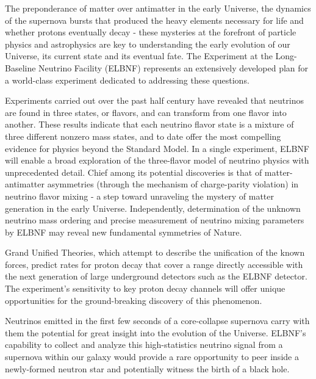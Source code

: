 



The preponderance of matter over antimatter in the early Universe, the dynamics of the supernova bursts that produced the heavy elements necessary for life and whether protons eventually decay - these mysteries at the forefront of particle physics and astrophysics are key to understanding the early evolution of our Universe, its current state and its eventual fate. The Experiment at the Long-Baseline Neutrino Facility (ELBNF) represents an extensively developed plan for a world-class experiment dedicated to addressing these questions.

Experiments carried out over the past half century have revealed that neutrinos are found in three states, or flavors, and can transform from one flavor into another. These results indicate that each neutrino flavor state is a mixture of three different nonzero mass states, and to date offer the most compelling evidence for physics beyond the Standard Model. In a single experiment, ELBNF will enable a broad exploration of the three-flavor model of neutrino physics with unprecedented detail. Chief among its potential discoveries is that of matter-antimatter asymmetries (through the mechanism of charge-parity violation) in neutrino flavor mixing - a step toward unraveling the mystery of matter generation in the early Universe. Independently, determination of the unknown neutrino mass ordering and precise measurement of neutrino mixing parameters by ELBNF may reveal new fundamental symmetries of Nature.

Grand Unified Theories, which attempt to describe the unification of the known forces, predict rates for proton decay that cover a range directly accessible with the next generation of large underground detectors such as the ELBNF detector. The experiment's sensitivity to key proton decay channels will offer unique opportunities for the ground-breaking discovery of this phenomenon.

Neutrinos emitted in the first few seconds of a core-collapse supernova carry with them the potential for great insight into the evolution of the Universe. ELBNF's capability to collect and analyze this high-statistics neutrino signal from a supernova within our galaxy would provide a rare opportunity to peer inside a newly-formed neutron star and potentially witness the birth of a black hole.

